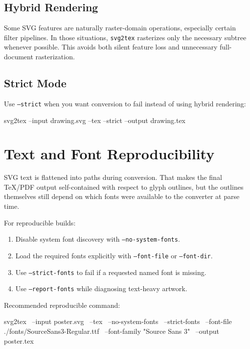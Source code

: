 \documentclass[11pt,a4paper]{article}
\begin{document}
\subsection{Hybrid Rendering}

Some SVG features are naturally raster-domain operations, especially certain filter pipelines.
In those situations, \texttt{svg2tex} rasterizes only the necessary subtree whenever possible.
This avoids both silent feature loss and unnecessary full-document rasterization.

\subsection{Strict Mode}

Use \texttt{--strict} when you want conversion to fail instead of using hybrid rendering:

\begin{codeblock}
svg2tex --input drawing.svg --tex --strict --output drawing.tex
\end{codeblock}

\section{Text and Font Reproducibility}

SVG text is flattened into paths during conversion. That makes the final TeX/PDF output self-contained
with respect to glyph outlines, but the outlines themselves still depend on which fonts were available
to the converter at parse time.

For reproducible builds:

\begin{enumerate}
\item Disable system font discovery with \texttt{--no-system-fonts}.
\item Load the required fonts explicitly with \texttt{--font-file} or \texttt{--font-dir}.
\item Use \texttt{--strict-fonts} to fail if a requested named font is missing.
\item Use \texttt{--report-fonts} while diagnosing text-heavy artwork.
\end{enumerate}

Recommended reproducible command:

\begin{codeblock}
svg2tex \
  --input poster.svg \
  --tex \
  --no-system-fonts \
  --strict-fonts \
  --font-file ./fonts/SourceSans3-Regular.ttf \
  --font-family "Source Sans 3" \
  --output poster.tex
\end{codeblock}
\end{document}
